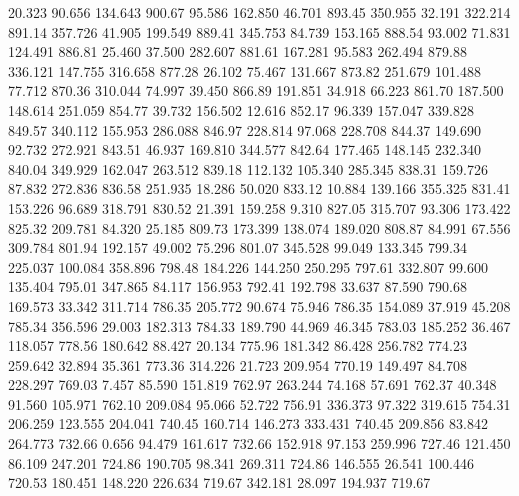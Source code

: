   20.323   90.656  134.643       900.67
  95.586  162.850   46.701       893.45
 350.955   32.191  322.214       891.14
 357.726   41.905  199.549       889.41
 345.753   84.739  153.165       888.54
  93.002   71.831  124.491       886.81
  25.460   37.500  282.607       881.61
 167.281   95.583  262.494       879.88
 336.121  147.755  316.658       877.28
  26.102   75.467  131.667       873.82
 251.679  101.488   77.712       870.36
 310.044   74.997   39.450       866.89
 191.851   34.918   66.223       861.70
 187.500  148.614  251.059       854.77
  39.732  156.502   12.616       852.17
  96.339  157.047  339.828       849.57
 340.112  155.953  286.088       846.97
 228.814   97.068  228.708       844.37
 149.690   92.732  272.921       843.51
  46.937  169.810  344.577       842.64
 177.465  148.145  232.340       840.04
 349.929  162.047  263.512       839.18
 112.132  105.340  285.345       838.31
 159.726   87.832  272.836       836.58
 251.935   18.286   50.020       833.12
  10.884  139.166  355.325       831.41
 153.226   96.689  318.791       830.52
  21.391  159.258    9.310       827.05
 315.707   93.306  173.422       825.32
 209.781   84.320   25.185       809.73
 173.399  138.074  189.020       808.87
  84.991   67.556  309.784       801.94
 192.157   49.002   75.296       801.07
 345.528   99.049  133.345       799.34
 225.037  100.084  358.896       798.48
 184.226  144.250  250.295       797.61
 332.807   99.600  135.404       795.01
 347.865   84.117  156.953       792.41
 192.798   33.637   87.590       790.68
 169.573   33.342  311.714       786.35
 205.772   90.674   75.946       786.35
 154.089   37.919   45.208       785.34
 356.596   29.003  182.313       784.33
 189.790   44.969   46.345       783.03
 185.252   36.467  118.057       778.56
 180.642   88.427   20.134       775.96
 181.342   86.428  256.782       774.23
 259.642   32.894   35.361       773.36
 314.226   21.723  209.954       770.19
 149.497   84.708  228.297       769.03
   7.457   85.590  151.819       762.97
 263.244   74.168   57.691       762.37
  40.348   91.560  105.971       762.10
 209.084   95.066   52.722       756.91
 336.373   97.322  319.615       754.31
 206.259  123.555  204.041       740.45
 160.714  146.273  333.431       740.45
 209.856   83.842  264.773       732.66
   0.656   94.479  161.617       732.66
 152.918   97.153  259.996       727.46
 121.450   86.109  247.201       724.86
 190.705   98.341  269.311       724.86
 146.555   26.541  100.446       720.53
 180.451  148.220  226.634       719.67
 342.181   28.097  194.937       719.67
